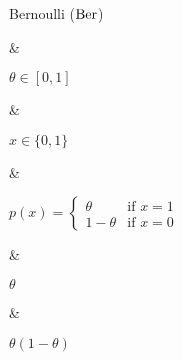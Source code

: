Bernoulli ($\operatorname{Ber}$)

&

$\theta \in [0, 1]$

& 

$x \in \{0, 1\}$

&

\(\displaystyle
	p(x) =
		\begin{cases}
			\theta 		& \text{if } x = 1 \\
			1 - \theta	& \text{if } x = 0
		\end{cases}
\)

&

$\theta$

&

$\theta (1 - \theta)$